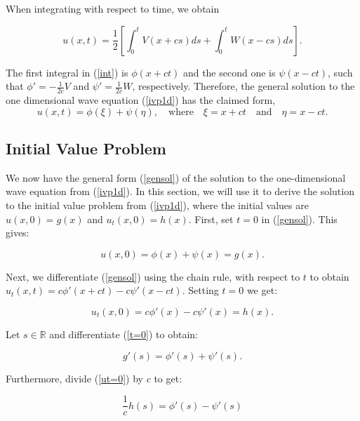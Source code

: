 \documentclass[a4paper, 12pt]{article}
\numberwithin{equation}{section}
\begin{document}
When integrating with respect to time, we obtain

\begin{equation} \label{int}
    u(x,t)=\frac{1}{2}\left[\int_0^t{V(x+cs)ds}+\int_0^t{W(x-cs)ds}\right].
\end{equation}

The first integral in (\ref{int}) is $\phi(x+ct)$ and the second one is
$\psi(x-ct)$, such that $\phi'=-\frac{1}{2c}V$ and $\psi'=\frac{1}{2c}W$,
respectively. Therefore, the general solution to the one dimensional wave
equation (\ref{ivp1d}) has the claimed form, 
\begin{equation} \label{gensol}
    u(x, t)=\phi(\xi)+\psi(\eta), \quad \textrm{where} \quad \xi=x+ct \quad \textrm{and} \quad \eta=x-ct.
\end{equation}

\subsection{Initial Value Problem}
We now have the general form (\ref{gensol}) of the solution to the
one-dimensional wave equation from (\ref{ivp1d}). In this section, we will use
it to derive the solution to the initial value problem from (\ref{ivp1d}),
where the initial values are $u(x,0)=g(x)$ and $u_t(x,0)=h(x)$. First, set $t=0$
in (\ref{gensol}). This gives:

\begin{equation} \label{t=0}
    u(x,0)=\phi(x)+\psi(x)=g(x).
\end{equation}

Next, we differentiate (\ref{gensol}) using the chain rule, with respect to $t$
to obtain $u_t(x,t)=c\phi'(x+ct)-c\psi'(x-ct)$. Setting $t=0$ we get:

\begin{equation} \label{ut=0}
    u_t(x,0)=c\phi'(x)-c\psi'(x)=h(x).
\end{equation}

Let $s \in \mathbb{R}$ and differentiate (\ref{t=0}) to obtain:

\begin{equation} \label{eqq9}
    g'(s)=\phi'(s)+\psi'(s).
\end{equation}

Furthermore, divide (\ref{ut=0}) by $c$ to get:

\begin{equation} \label{eqq10}
    \frac{1}{c}h(s)=\phi'(s)-\psi'(s)
\end{equation}
\end{document}
